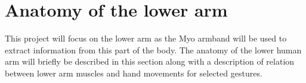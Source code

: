 \section{Anatomy of the lower arm}


This project will focus on the lower arm as the Myo armband will be used to extract information from this part of the body. The anatomy of the lower human arm will briefly be described in this section along with a description of relation between lower arm muscles and hand movements for selected gestures. \\

